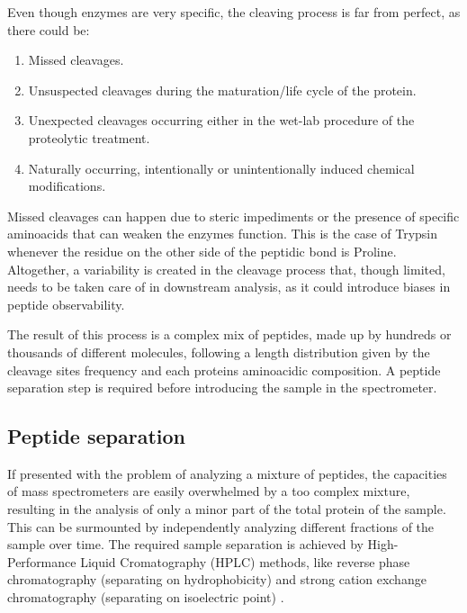 Even though enzymes are very specific, the cleaving process is far from perfect, as there could be: \cite{Barsnes2008}

\begin{enumerate}

\item Missed cleavages.

\item Unsuspected cleavages during the maturation/life cycle of the protein.

\item Unexpected cleavages occurring either in the wet-lab procedure of the proteolytic treatment.

\item Naturally occurring, intentionally or unintentionally induced chemical modifications.

\end{enumerate}


Missed cleavages can happen due to steric impediments or the presence of specific aminoacids that can weaken the enzyme\textquotesingle s function. This is the case of Trypsin whenever the residue on the other side of the peptidic bond is Proline. Altogether, a variability is created in the cleavage process that, though limited, needs to be taken care of in downstream analysis, as it could introduce biases in peptide observability. 

The result of this process is a complex mix of peptides, made up by hundreds or thousands of different molecules, following a length distribution given by the cleavage sites frequency and each protein\textquotesingle s aminoacidic composition. A peptide separation step is required before introducing the sample in the spectrometer.

\subsection{Peptide separation}
\label{subsec:peptide_separation}

If presented with the problem of analyzing a mixture of peptides, the capacities of mass spectrometers are easily overwhelmed by a too complex mixture, resulting in the analysis of only a minor part of the total protein of the sample. This can be surmounted by independently analyzing different fractions of the sample over time. The required sample separation is achieved by High-Performance Liquid Cromatography (\ac{HPLC}) methods, like reverse phase chromatography (separating on hydrophobicity) and strong cation exchange chromatography (separating on isoelectric point) \cite{Barsnes2008}.

